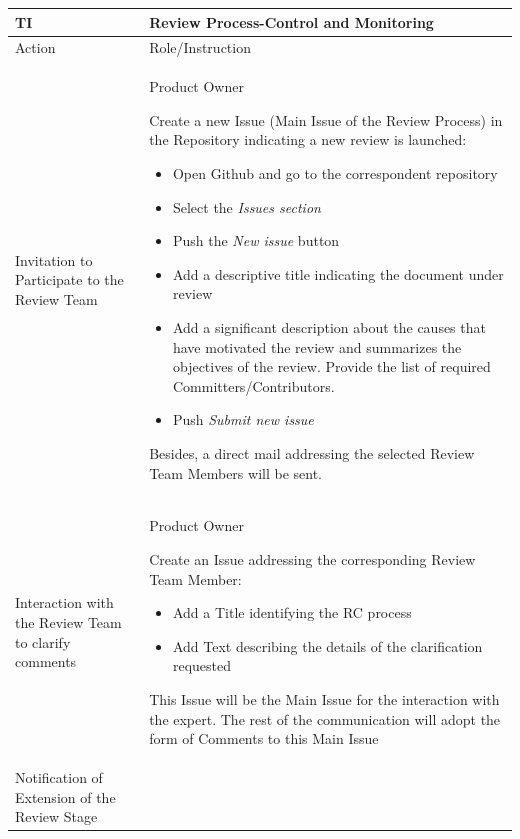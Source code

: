 \documentclass{template/openetcs_article}
\begin{document}
\begin{table}[H]
\begin{tabular}{|m{3cm}|m{11cm}|}
\hline
\rowcolor{myblue}
TI & 
Review Process-Control and Monitoring
\\\hline
\rowcolor{lightgray}
Action &
Role/Instruction
\\\hline
Invitation to Participate to the Review Team &
\begin{description}
\item Product Owner\
\item Create a new Issue (Main Issue of the Review Process) in the Repository indicating a new review is launched:
\begin{itemize}
\item Open Github and go to the correspondent repository
\item Select the {\it Issues section}
\item Push the {\it New issue} button
\item Add a descriptive title indicating the document under review
\item Add a significant description about the causes that have motivated the review and summarizes the objectives of the review. Provide the list of required Committers/Contributors.
\item Push {\it Submit new issue} 
\end{itemize}
\item Besides, a direct mail addressing the selected Review Team Members will be sent.
\end{description} 
\\\hline
Interaction with the Review Team to clarify comments &
\begin{description}
\item Product Owner\
\item Create an Issue addressing the corresponding Review Team Member:
\begin{itemize}
\item Add a Title identifying the RC process
\item Add Text describing the details of the clarification requested
\end{itemize}
\item This Issue will be the Main Issue for the interaction with the expert. The rest of the communication will adopt the form of Comments to this Main Issue
\end{description}
\\\hline
Notification of Extension of the Review Stage &

\end{tabular}
\end{table}
\end{document}
